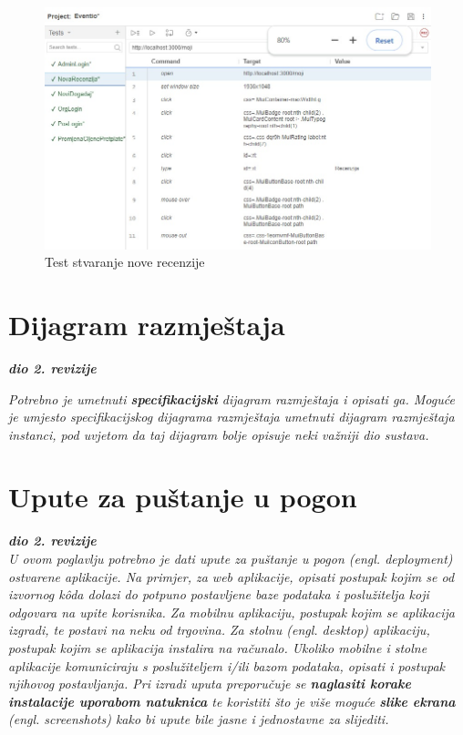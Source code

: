 			\begin{figure}[H]
				\includegraphics[scale=0.45]{testovi/selRecenzija.jpeg}
				\centering
				\caption{Test stvaranje nove recenzije}
				\label{fig:promjene}
			\end{figure}
			
		
		
		\section{Dijagram razmještaja}
			
			\textbf{\textit{dio 2. revizije}}
			
			 \textit{Potrebno je umetnuti \textbf{specifikacijski} dijagram razmještaja i opisati ga. Moguće je umjesto specifikacijskog dijagrama razmještaja umetnuti dijagram razmještaja instanci, pod uvjetom da taj dijagram bolje opisuje neki važniji dio sustava.}
			
			\eject 
		
		\section{Upute za puštanje u pogon}
		
			\textbf{\textit{dio 2. revizije}}\\
		
			 \textit{U ovom poglavlju potrebno je dati upute za puštanje u pogon (engl. deployment) ostvarene aplikacije. Na primjer, za web aplikacije, opisati postupak kojim se od izvornog kôda dolazi do potpuno postavljene baze podataka i poslužitelja koji odgovara na upite korisnika. Za mobilnu aplikaciju, postupak kojim se aplikacija izgradi, te postavi na neku od trgovina. Za stolnu (engl. desktop) aplikaciju, postupak kojim se aplikacija instalira na računalo. Ukoliko mobilne i stolne aplikacije komuniciraju s poslužiteljem i/ili bazom podataka, opisati i postupak njihovog postavljanja. Pri izradi uputa preporučuje se \textbf{naglasiti korake instalacije uporabom natuknica} te koristiti što je više moguće \textbf{slike ekrana} (engl. screenshots) kako bi upute bile jasne i jednostavne za slijediti.}
			
